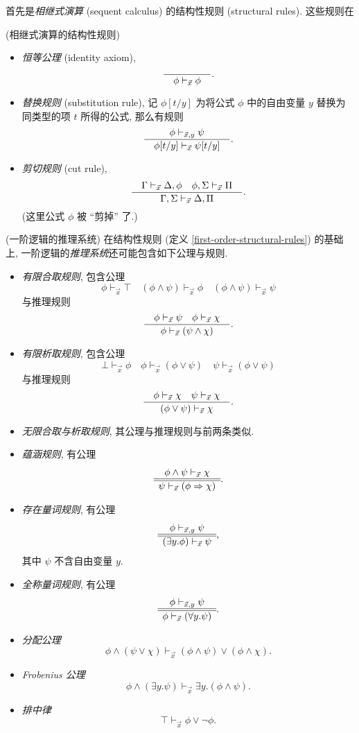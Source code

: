 首先是\emph{相继式演算} (sequent calculus) 的结构性规则 (structural rules). 这些规则在

\begin{definition}
	[label={first-order-structural-rules}]
	{(相继式演算的结构性规则)}
	\begin{itemize}
		\item \emph{恒等公理} (identity axiom),
		$$
		\dfrac{\quad  \quad}{\quad \phi\vdash_{\vec x} \phi \quad}.
		$$
		\item \emph{替换规则} (substitution rule),
		记 $\phi[t/y]$ 为将公式 $\phi$ 中的自由变量 $y$ 替换为同类型的项 $t$ 所得的公式, 那么有规则
		$$
		\dfrac{\quad \phi \vdash_{\vec x,y} \psi \quad}{\quad \phi[t/y]\vdash_{\vec x}\psi[t/y] \quad}.
		$$
		\item \emph{剪切规则} (cut rule),
		$$
		\dfrac{\quad 
			\Gamma \vdash_{\vec x} \Delta , \phi
			\quad
			\phi, \Sigma \vdash_{\vec x} \Pi 
		 \quad}{\quad 
			\Gamma,\Sigma \vdash_{\vec x} \Delta,\Pi
		 \quad}.
		$$
		(这里公式 $\phi$ 被 ``剪掉'' 了.)
	\end{itemize}
\end{definition}

\begin{definition}
	[label={deduction-system-first-order-logic}]
	{(一阶逻辑的推理系统)}
	在结构性规则 (定义 \ref{first-order-structural-rules}) 的基础上, 一阶逻辑的\emph{推理系统}还可能包含如下公理与规则.
	\begin{itemize}
		\item \emph{有限合取规则}, 包含公理
		$$
		\phi \vdash_{\vec x} \top
		\quad
		(\phi\wedge\psi)\vdash_{\vec x} \phi
		\quad
		(\phi\wedge\psi)\vdash_{\vec x} \psi
		$$
		与推理规则
		$$
		\dfrac{\quad \phi\vdash_{\vec x} \psi\quad \phi\vdash_{\vec x} \chi \quad}{\quad \phi\vdash_{\vec x} (\psi\wedge\chi) \quad}.
		$$
		\item \emph{有限析取规则}, 包含公理
		$$
		\bot \vdash_{\vec x} \phi
		\quad
		\phi \vdash_{\vec x} (\phi\vee\psi)
		\quad
		\psi \vdash_{\vec x} (\phi\vee\psi)
		$$
		与推理规则
		$$
		\dfrac{\quad \phi \vdash_{\vec x} \chi \quad \psi \vdash_{\vec x} \chi \quad}{\quad  (\phi\vee\psi)\vdash_{\vec x}\chi \quad}.
		$$
		\item \emph{无限合取与析取规则}, 其公理与推理规则与前两条类似.
		\item \emph{蕴涵规则}, 有公理
		$$
		\begin{array} {c} \phi\wedge\psi \vdash_{\vec x} \chi \\ \hline \hline \psi\vdash_{\vec x} (\phi\Rightarrow\chi) \end{array}.
		$$
		\item \emph{存在量词规则}, 有公理
		$$
		\begin{array} {c} \phi \vdash_{\vec x,y} \psi \\ \hline \hline (\exists y.\phi)\vdash_{\vec x} \psi \end{array},
		$$
		其中 $\psi$ 不含自由变量 $y$.
		\item \emph{全称量词规则}, 有公理
		$$
		\begin{array} {c} \phi \vdash_{\vec x,y} \psi \\ \hline \hline \phi\vdash_{\vec x} (\forall y.\psi) \end{array}.
		$$
		\item \emph{分配公理}
		$$
		\phi\wedge(\psi\vee\chi)\vdash_{\vec{x}}(\phi\wedge\psi)\vee(\phi\wedge\chi).
		$$
		\item \emph{Frobenius 公理}
		$$
		\phi\land(\exists y.\psi)\vdash_{\vec{x}}\exists y.(\phi\land\psi).
		$$
		\item \emph{排中律}
		$$
		\top\vdash_{\vec{x}}\phi\lor\neg\phi.
		$$
	\end{itemize}
\end{definition}

